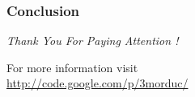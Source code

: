 \frame
{
  \frametitle{Conclusion}
  
  \emph{Thank You For Paying Attention !}

  \vskip15pt

  For more information visit \\
  \vskip5pt
  \url{http://code.google.com/p/3morduc/}
  
}
